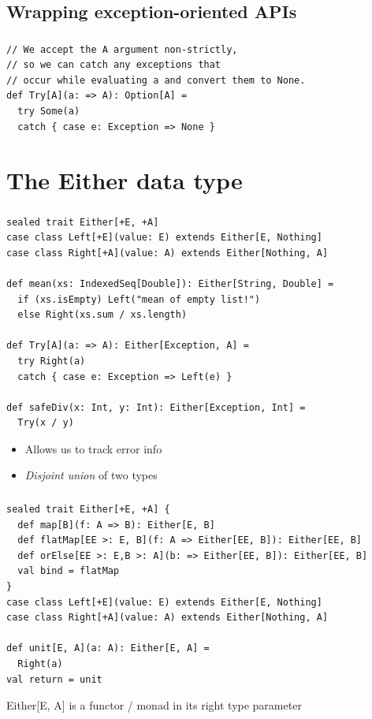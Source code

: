 \documentclass{beamer}
\begin{document}
\subsection{Wrapping exception-oriented APIs}

\begin{frame}[fragile]
  \frametitle{\subsecname}
\begin{lstlisting}
// We accept the A argument non-strictly,
// so we can catch any exceptions that
// occur while evaluating a and convert them to None.
def Try[A](a: => A): Option[A] =
  try Some(a)
  catch { case e: Exception => None }
\end{lstlisting}
\end{frame}

\section{The {\ttfamily Either} data type}

\begin{frame}[fragile,t]
  \frametitle{\secname}
\begin{lstlisting}
sealed trait Either[+E, +A]
case class Left[+E](value: E) extends Either[E, Nothing]
case class Right[+A](value: A) extends Either[Nothing, A]

def mean(xs: IndexedSeq[Double]): Either[String, Double] =
  if (xs.isEmpty) Left("mean of empty list!")
  else Right(xs.sum / xs.length)

def Try[A](a: => A): Either[Exception, A] =
  try Right(a)
  catch { case e: Exception => Left(e) }

def safeDiv(x: Int, y: Int): Either[Exception, Int] =
  Try(x / y)
\end{lstlisting}
\begin{itemize}
  \item Allows us to track error info
  \item {\itshape Disjoint union} of two types
\end{itemize}
\end{frame}

\begin{frame}[fragile,t]
  \frametitle{\secname}
\begin{lstlisting}
sealed trait Either[+E, +A] {
  def map[B](f: A => B): Either[E, B]
  def flatMap[EE >: E, B](f: A => Either[EE, B]): Either[EE, B]
  def orElse[EE >: E,B >: A](b: => Either[EE, B]): Either[EE, B]
  val bind = flatMap
}
case class Left[+E](value: E) extends Either[E, Nothing]
case class Right[+A](value: A) extends Either[Nothing, A]

def unit[E, A](a: A): Either[E, A] =
  Right(a)
val return = unit
\end{lstlisting}
{\ttfamily Either[E, A]} is a functor / monad in its right type parameter
\end{frame}
\end{document}
